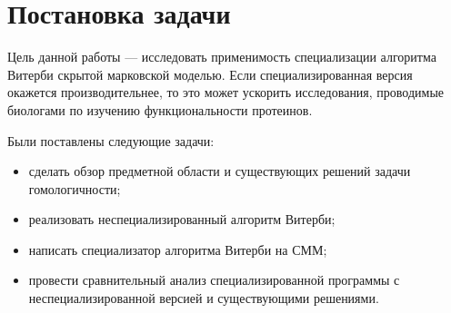 \section{Постановка задачи}
Цель данной работы --- исследовать применимость специализации
алгоритма Витерби скрытой марковской моделью.
Если специализированная версия окажется производительнее, 
то это может ускорить исследования, проводимые биологами по 
изучению функциональности протеинов.

Были поставлены следующие задачи:
\begin{itemize}
	\item сделать обзор предметной области и существующих решений задачи 
		гомологичности;
	\item реализовать неспециализированный алгоритм Витерби;
	\item написать специализатор алгоритма Витерби на СММ;
	\item провести сравнительный анализ специализированной программы с
		неспециализированной версией и существующими решениями.
\end{itemize}
